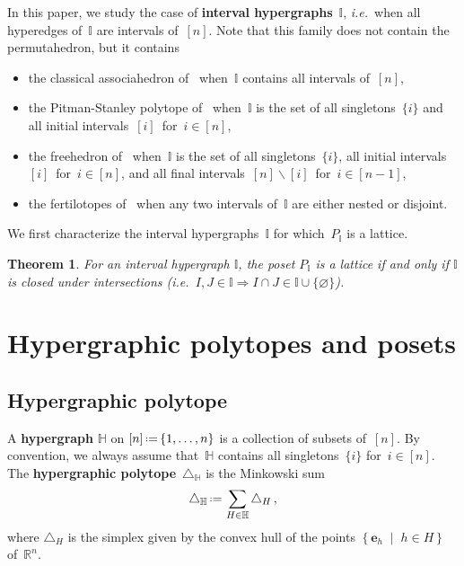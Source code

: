 \documentclass[reqno]{amsart}
\newtheorem{theoremA}{Theorem}
\theoremstyle{definition}
\newcommand{\R}{\mathbb{R}} %
\renewcommand{\b}[1]{\boldsymbol{#1}} %
\newcommand{\set}[2]{\left\{ #1 \;\middle|\; #2 \right\}} %
\newcommand{\ssm}{\smallsetminus} %
\newcommand{\eqdef}{\mbox{\,\raisebox{0.2ex}{\scriptsize\ensuremath{\mathrm:}}\ensuremath{=}\,}} %
\newcommand{\simplex}{\triangle} %
\newcommand{\ie}{\textit{i.e.}~} %
\newcommand{\defn}[1]{\textbf{\textsf{\color{PineGreen} #1}}} %
\newcommand{\vincent}[1]{\todo[color=blue!30]{#1 \\ \hfill --- V.}}
\newcommand{\HH}{\mathbb H}  %
\newcommand{\II}{\mathbb I} %
\begin{document}
In this paper, we study the case of \defn{interval hypergraphs}~$\II$, \ie when all hyperedges of~$\II$ are intervals of~$[n]$.
Note that this family does not contain the permutahedron, but it contains
\begin{itemize}
\item the classical associahedron of~\cite{ShniderSternberg,Loday} when~$\II$ contains all intervals of~$[n]$,
\item the Pitman-Stanley polytope of~\cite{PitmanStanley} when~$\II$ is the set of all singletons~$\{i\}$ and all initial intervals~$[i]$~for~${i \in [n]}$,
\item the freehedron of~\cite{Saneblidze-freehedron} when~$\II$ is the set of all singletons~$\{i\}$, all initial intervals~$[i]$~for~${i \in [n]}$, and all final intervals~$[n] \ssm [i]$~for~${i \in [n-1]}$,
\item the fertilotopes of~\cite{Defant-fertilitopes} when any two intervals of~$\II$ are either nested or disjoint.
\end{itemize}
We first characterize the interval hypergraphs~$\II$ for which~$P_\II$ is a lattice.

\begin{theoremA}
\label{thm:latticeI}
For an interval hypergraph $\II$, the poset $P_\II$ is a lattice if and only if $\II$ is closed under intersections (\ie $I, J \in \II \Rightarrow I \cap J \in \II \cup \{\varnothing\}$).
\end{theoremA}

\vincent{In progress}


\section{Hypergraphic polytopes and posets}
\label{sec:HP}


\subsection{Hypergraphic polytope} 
\label{subsec:D_H}

A \defn{hypergraph} $\HH$ on $[n] \eqdef \{1, \dots, n\}$ is a collection of  subsets of~$[n]$.
By convention, we always assume that~$\HH$ contains all singletons~$\{i\}$ for~$i\in [n]$.
The \defn{hypergraphic polytope}~$\simplex_\HH$ is the Minkowski sum
\[
\simplex_\HH \eqdef \sum_{H\in \HH} \simplex_H\,,
\]
where $\simplex_H$ is the simplex given by the convex hull of the points $\set{\b{e}_h}{h \in H}$ of~$\R^n$.
\end{document}
